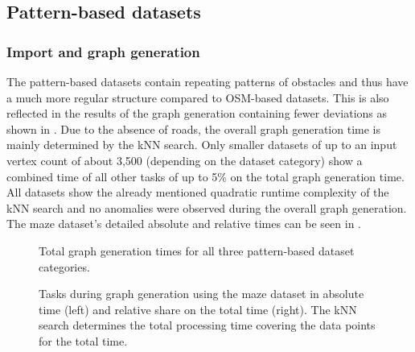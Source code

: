 	\subsection{Pattern-based datasets}
	
		\subsubsection{Import and graph generation}
		
			The pattern-based datasets contain repeating patterns of obstacles and thus have a much more regular structure compared to OSM-based datasets.
			This is also reflected in the results of the graph generation containing fewer deviations as shown in .
			Due to the absence of roads, the overall graph generation time is mainly determined by the kNN search.
			Only smaller datasets of up to an input vertex count of about 3,500 (depending on the dataset category) show a combined time of all other tasks of up to 5\% on the total graph generation time.
			All datasets show the already mentioned quadratic runtime complexity of the kNN search and no anomalies were observed during the overall graph generation.
			The maze dataset's detailed absolute and relative times can be seen in .
			
			\begin{figure}[h]
				\begin{figcenter}
					
				\end{figcenter}
				\caption{Total graph generation times for all three pattern-based dataset categories.}
				\label{fig:eval-import-pattern-abs}
			\end{figure}
			
			\begin{figure}[h]
				\begin{figcenter}
					
				\end{figcenter}
				\caption[Absolute and relative graph generation time per task for the maze dataset.]{Tasks during graph generation using the maze dataset in absolute time (left) and relative share on the total time (right). The kNN search determines the total processing time covering the data points for the total time.}
				\label{fig:eval-import-pattern-maze-abs-rel}
			\end{figure}
		
